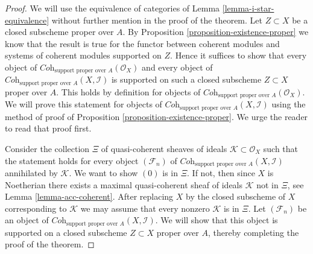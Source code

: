 \begin{proof}
We will use the equivalence of categories of
Lemma \ref{lemma-i-star-equivalence}
without further mention in the proof of the theorem.
Let $Z \subset X$ be a closed subscheme proper over $A$.
By Proposition \ref{proposition-existence-proper} we know
that the result is true for
the functor between coherent modules and systems of coherent
modules supported on $Z$. Hence it suffices to show that
every object of
$\textit{Coh}_{\text{support proper over }A}(\mathcal{O}_X)$
and every object of
$\textit{Coh}_{\text{support proper over }A}(X, \mathcal{I})$ is
supported on such a closed subscheme $Z \subset X$ proper over $A$.
This holds by definition for objects of
$\textit{Coh}_{\text{support proper over }A}(\mathcal{O}_X)$.
We will prove this statement for objects of
$\textit{Coh}_{\text{support proper over }A}(X, \mathcal{I})$
using the method of proof of Proposition \ref{proposition-existence-proper}.
We urge the reader to read that proof first.

\medskip\noindent
Consider the collection $\Xi$ of quasi-coherent sheaves of ideals
$\mathcal{K} \subset \mathcal{O}_X$ such that the statement holds
for every object $(\mathcal{F}_n)$ of
$\textit{Coh}_{\text{support proper over }A}(X, \mathcal{I})$
annihilated by $\mathcal{K}$. We want to show $(0)$ is in $\Xi$.
If not, then since $X$ is Noetherian there exists a maximal
quasi-coherent sheaf of ideals $\mathcal{K}$ not in $\Xi$, see
Lemma \ref{lemma-acc-coherent}.
After replacing $X$ by the closed subscheme of $X$
corresponding to $\mathcal{K}$ we may assume that every nonzero
$\mathcal{K}$ is in $\Xi$. Let $(\mathcal{F}_n)$ be an object of
$\textit{Coh}_{\text{support proper over }A}(X, \mathcal{I})$.
We will show that this object is supported on a closed subscheme
$Z \subset X$ proper over $A$, thereby completing the
proof of the theorem.


\end{proof}
